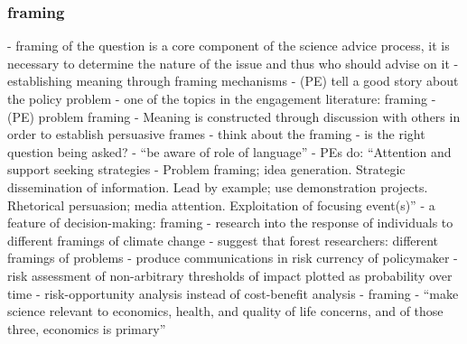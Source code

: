 \subsubsection{framing}
\cite[p18]{OECD2015} - framing of the question is a core component of the science advice process, it is necessary to determine the nature of the issue and thus who should advise on it
\cite{AukesLB2018} - establishing meaning through framing mechanisms
\cite{Cairney2018} - (PE) tell a good story about the policy problem
\cite{CairneyO2020} - one of the topics in the engagement literature: framing
\cite{Mintrom2019} - (PE) problem framing - Meaning is constructed through discussion with others in order to establish persuasive frames
\cite{GluckmanBK2021} - think about the framing - is the right question being asked?
\cite{ElsensohnACDGGKPRS2019} - ``be aware of role of language''
\cite{vonMalmborg2024strategies} - PEs do: ``Attention and support seeking strategies - Problem framing; idea generation. Strategic dissemination of information. Lead by example; use demonstration projects. Rhetorical persuasion; media attention. Exploitation of focusing event(s)''
\cite{MoallemiZHSMZHKHMGLB2023} - a feature of decision-making: framing
\cite{NabiGJ2018} - research into the response of individuals to different framings of climate change
\cite{OjanenBKP2021} - suggest that forest researchers: different framings of problems
\cite{DeMeyer2019} - produce communications in risk currency of policymaker
\cite{Sharpe2019} - risk assessment of non-arbitrary thresholds of impact plotted as probability over time
\cite{SharpeMVIGPKN2021} - risk-opportunity analysis instead of cost-benefit analysis
\cite{ThompsonD2024} - framing
\cite{RykielEtAl2002} - ``make science relevant to economics, health, and quality of life concerns, and of those three, economics is primary''


